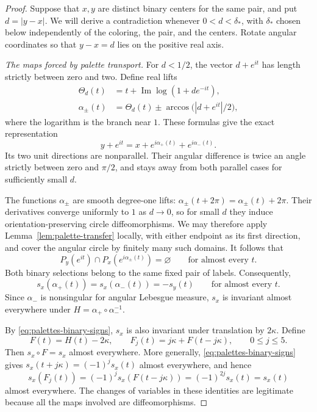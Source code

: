 \begin{proof}
Suppose that \(x,y\) are distinct binary centers for the same pair,
and put \(d=|y-x|\).  We will derive a contradiction whenever
\(0<d<\delta_*\), with \(\delta_*\) chosen below independently of the
coloring, the pair, and the centers.  Rotate angular coordinates so
that \(y-x=d\) lies on the positive real axis.

\smallskip
\noindent\emph{The maps forced by palette transport.}
For \(d<1/2\), the vector \(d+e^{it}\) has length strictly between
zero and two.  Define real lifts
\[
 \begin{split}
 \Theta_d(t)&=t+\operatorname{Im}\log(1+d e^{-it}),\\
 \alpha_\pm(t)&=\Theta_d(t)
       \pm\arccos\bigl(|d+e^{it}|/2\bigr),
 \end{split}
\]
where the logarithm is the branch near \(1\).  These formulas give
the exact representation
\[
 y+e^{it}
   =x+e^{i\alpha_+(t)}+e^{i\alpha_-(t)}.
\]
Its two unit directions are nonparallel.  Their angular difference
is twice an angle strictly between zero and \(\pi/2\), and stays
away from both parallel cases for sufficiently small \(d\).

The functions \(\alpha_\pm\) are smooth degree-one lifts:
\(\alpha_\pm(t+2\pi)=\alpha_\pm(t)+2\pi\).  Their derivatives converge
uniformly to \(1\) as \(d\to0\), so for small \(d\) they induce
orientation-preserving circle diffeomorphisms.  We may therefore
apply Lemma~\ref{lem:palette-transfer} locally, with either endpoint
as its first direction, and cover the angular circle by finitely
many such domains.  It follows that
\[
 P_y(e^{it})\cap P_x(e^{i\alpha_\pm(t)})=\varnothing
 \qquad\text{for almost every }t.
\]
Both binary selections belong to the same fixed pair of labels.
Consequently,
\[
 s_x(\alpha_+(t))=s_x(\alpha_-(t))=-s_y(t)
 \qquad\text{for almost every }t.
\]
Since \(\alpha_-\) is nonsingular for angular Lebesgue measure,
\(s_x\) is invariant almost everywhere under
\(H=\alpha_+\circ\alpha_-^{-1}\).

By \eqref{eq:palettes-binary-signs}, \(s_x\) is also invariant under
translation by \(2\kappa\).  Define
\[
 F(t)=H(t)-2\kappa,\qquad
 F_j(t)=j\kappa+F(t-j\kappa),\qquad 0\le j\le5.
\]
Then \(s_x\circ F=s_x\) almost everywhere.  More generally,
\eqref{eq:palettes-binary-signs} gives
\(s_x(t+j\kappa)=(-1)^j s_x(t)\) almost everywhere, and hence
\[
 s_x(F_j(t))
 =(-1)^j s_x(F(t-j\kappa))
 =(-1)^{2j}s_x(t)
 =s_x(t)
\]
almost everywhere.  The changes of variables in these identities
are legitimate because all the maps involved are diffeomorphisms.


\end{proof}
